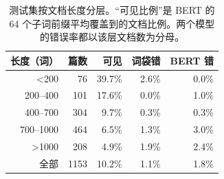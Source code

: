 \begin{table}[t]
\centering
\scriptsize
\caption{测试集按文档长度分层。``可见比例''是 BERT 的 64 个子词前缀平均覆盖到的文档比例。两个模型的错误率都以该层文档数为分母。}
\label{tab:by-length}
\begin{tabular}{rrrrr}
\toprule
长度（词） & 篇数 & 可见 & 词袋错 & BERT 错 \\
\midrule
<200 & 76 & 39.7\% & 2.6\% & 0.0\% \\
200--400 & 101 & 17.6\% & 0.0\% & 1.0\% \\
400--700 & 304 & 9.7\% & 0.3\% & 0.3\% \\
700--1000 & 464 & 6.5\% & 1.3\% & 3.0\% \\
>1000 & 208 & 4.9\% & 1.9\% & 2.4\% \\
\midrule
全部 & 1153 & 10.2\% & 1.1\% & 1.8\% \\
\bottomrule
\end{tabular}
\end{table}
